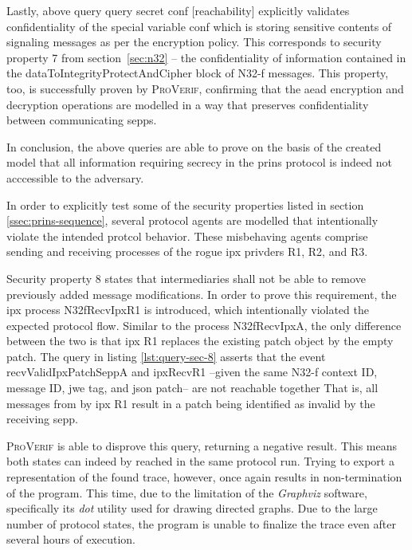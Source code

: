 Lastly, above query {\sffamily query secret conf [reachability]} explicitly validates confidentiality of the special variable {\sffamily conf} which is storing sensitive contents of signaling messages as per the encryption policy.
This corresponds to security property 7 from section~\ref{sec:n32} -- the confidentiality of information contained in the {\sffamily dataToIntegrityProtectAndCipher} block of N32-f messages.
This property, too, is successfully proven by \textsc{ProVerif}, confirming that the \gls{aead} encryption and decryption operations are modelled in a way that preserves confidentiality between communicating \glspl{sepp}.

In conclusion, the above queries are able to prove on the basis of the created model that all information requiring secrecy in the \gls{prins} protocol is indeed not acccessible to the adversary.\bigskip

In order to explicitly test some of the security properties listed in section \ref{ssec:prins-sequence}, several protocol agents are modelled that intentionally violate the intended protcol behavior.
These misbehaving agents comprise sending and receiving processes of the rogue \gls{ipx} privders R1, R2, and R3.

Security property 8 states that intermediaries shall not be able to remove previously added message modifications.
In order to prove this requirement, the \gls{ipx} process {\sffamily N32fRecvIpxR1} is introduced, which intentionally violated the expected protocol flow.
Similar to the process {\sffamily N32fRecvIpxA}, the only difference between the two is that \gls{ipx} R1 replaces the existing patch object by the empty patch.
The query in listing \ref{lst:query-sec-8} asserts that the event {\sffamily recvValidIpxPatchSeppA} and {\sffamily ipxRecvR1} --given the same N32-f context ID, message ID, \gls{jwe} tag, and \gls{json} patch-- are not reachable together
That is, all messages from by \gls{ipx} R1 result in a patch being identified as invalid by the receiving \gls{sepp}.

\textsc{ProVerif} is able to disprove this query, returning a negative result.
This means both states can indeed by reached in the same protocol run.
Trying to export a representation of the found trace, however, once again results in non-termination of the program.
This time, due to the limitation of the \textit{Graphviz} software, specifically its \textit{dot} utility used for drawing directed graphs.
Due to the large number of protocol states, the program is unable to finalize the trace even after several hours of execution.

